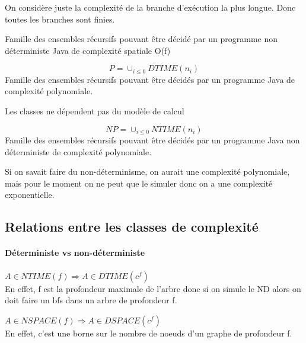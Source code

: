 \begin{myrem}
	On considère juste la complexité de la branche d'exécution la plus
	longue. Donc toutes les branches sont finies.	
\end{myrem}

\begin{mydef}[NDSPACE(f)]
	Famille des ensembles récursifs pouvant être décidé par un programme 
	non déterministe Java de complexité spatiale O(f)
\end{mydef}

\begin{mydef}[Classe P]
	\[ P = \cup _{i \leq 0} DTIME(n_i)\]
	Famille des ensembles récursifs pouvant être décidés par un programme
	Java de complexité polynomiale.
\end{mydef}

\begin{myrem}
	Les classes ne dépendent pas du modèle de calcul
\end{myrem}

\begin{mydef}[Classe NP]
	\[ NP = \cup _{i \leq 0} NTIME(n_i)\]
	Famille des ensembles récursifs pouvant être décidés par un programme
	Java non déterministe de complexité polynomiale.
\end{mydef}

\begin{myrem}
	Si on savait faire du non-déterminisme, on aurait une complexité polynomiale,
	mais pour le moment on ne peut que le simuler donc on a une complexité
	exponentielle.
\end{myrem}

\subsection{Relations entre les classes de complexité}
\label{sub:relations_entre_les_classes_de_complexit_}

\paragraph{Déterministe vs non-déterministe}
\begin{myprop}
	$A \in NTIME(f) \Rightarrow A \in DTIME(c^f)$ \\
	En effet, f est la profondeur maximale de l'arbre donc si on simule le
	ND alors on doit faire un bfs dans un arbre de profondeur f.
\end{myprop}

\begin{myprop}
	$A \in NSPACE(f) \Rightarrow A \in DSPACE(c^f)$ \\
	En effet, c'est une borne sur le nombre de noeuds d'un graphe de
	profondeur f.
\end{myprop}

